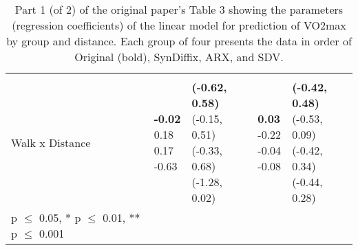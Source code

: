 \begin{table}
\begin{center}
\begin{small}
\begin{tabular}{lllll}
& & & & \\ 
\quad Walk x Distance    &  \makecell[l]{\textbf{-0.02} \\0.18 \\0.17 \\-0.63 \\}   &  \makecell[l]{\textbf{(-0.62, 0.58)} \\(-0.15, 0.51) \\(-0.33, 0.68) \\(-1.28, 0.02) \\}   &  \makecell[l]{\textbf{0.03} \\-0.22 \\-0.04 \\-0.08 \\}   &  \makecell[l]{\textbf{(-0.42, 0.48)} \\(-0.53, 0.09) \\(-0.42, 0.34) \\(-0.44, 0.28) \\} \\ 

      \bottomrule
      {\footnotesize * p $\leq$ 0.05, \quad** p $\leq$ 0.01, \quad*** p $\leq$ 0.001}
      \end{tabular}
      \end{small}
      \caption{Part 1 (of 2) of the original paper's Table 3 showing the parameters (regression coefficients) of the linear model for prediction of VO2max by group and distance. Each group of four presents the data in order of Original (bold), SynDiffix, ARX, and SDV. 
      }
      \label{tab:table3a}
      \end{center}
      \end{table}
    